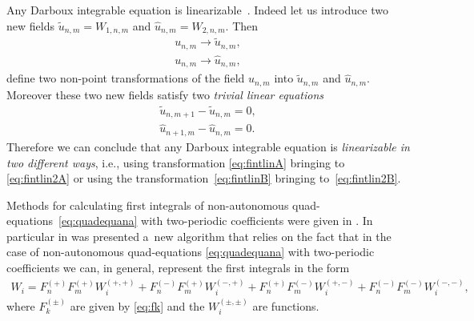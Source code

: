 \documentclass[pdftex]{sigma}
\numberwithin{equation}{section}
\newcommand{\Fp}[1]{F^{(+)}_{#1}}
\newcommand{\Fm}[1]{F^{(-)}_{#1}}
\newcommand{\Fppp}{\Fp{n}\Fp{m}}
\newcommand{\Fpmm}{\Fp{n}\Fm{m}}
\newcommand{\Fmpm}{\Fm{n}\Fp{m}}
\newcommand{\Fmmp}{\Fm{n}\Fm{m}}
\begin{document}
Any Darboux integrable equation is linearizable~\cite{AdlerStartsev1999}.
Indeed let us introduce two new f\/ields $\tilde{u}_{n,m}=W_{1,n,m}$ and $\hat{u}_{n,m}=W_{2,n,m}$. Then
\begin{subequations} \label{eq:fintlin}
 \begin{gather}
 u_{n,m} \to \tilde u_{n,m}, \label{eq:fintlinA} \\
 u_{n,m} \to \hat u_{n,m}, \label{eq:fintlinB}
 \end{gather}
\end{subequations}
def\/ine two non-point transformations of the f\/ield $u_{n,m}$ into $\tilde{u}_{n,m}$ and $\hat{u}_{n,m}$.
Moreover these two new f\/ields satisfy two \emph{trivial linear equations}
\begin{subequations} \label{eq:fintlin2}
 \begin{gather}
 \tilde u_{n,m+1} - \tilde u_{n,m} = 0 , \label{eq:fintlin2A} \\
 \hat u_{n+1,m} - \hat u_{n,m} = 0. \label{eq:fintlin2B}
 \end{gather}
\end{subequations}
Therefore we can conclude that any Darboux integrable equation is \emph{linearizable in two different ways}, i.e.,
using transformation \eqref{eq:fintlinA} bringing to \eqref{eq:fintlin2A} or using the transformation~\eqref{eq:fintlinB} bringing to~\eqref{eq:fintlin2B}.

Methods for calculating f\/irst integrals of non-autonomous quad-equations~\eqref{eq:quadequana} with two-periodic coef\/f\/icients were given in \cite{GarifullinYamilov2015,GSY_DarbouxI}. In particular in \cite{GSY_DarbouxI} was presented a~new algorithm that relies on the fact that in the case of non-autonomous quad-equations \eqref{eq:quadequana} with two-periodic coef\/f\/icients we can, in general, represent the f\/irst integrals in the form{\samepage
\begin{gather*}
 W_{i} = \Fppp W_{i}^{(+,+)}+\Fmpm W_{i}^{(-,+)}
 +\Fpmm W_{i}^{(+,-)} + \Fmmp W_{i}^{(-,-)}, %
\end{gather*}
where $F_{k}^{(\pm)}$ are given by \eqref{eq:fk} and the $W_{i}^{(\pm,\pm)}$ are functions.}
\end{document}
